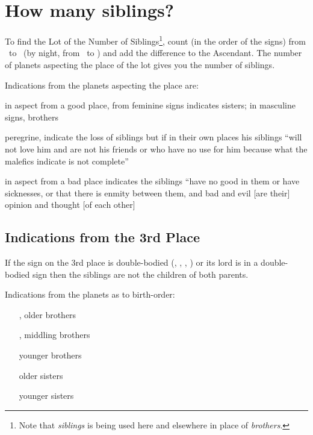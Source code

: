 \section{How many siblings?}
To find the Lot of the Number of Siblings\footnote{Note that \textsl{siblings} is being used here and elsewhere in place of \textsl{brothers}.}, count (in the order of the signs) from \Mercury\, to \Jupiter\, (by night, from \Jupiter\, to \Mercury) and add the difference to the Ascendant. The number of planets aspecting the place of the lot gives you the number of siblings.

Indications from the planets aspecting the place are:
\begin{description}[labelindent=0em , labelwidth=6em, labelsep=0.5em, leftmargin =!]
\item [\Venus,\Mercury] in aspect from a good place, from feminine signs indicates sisters; in masculine signs, brothers

\item[\Saturn,\Mars,\Sun\,\Moon] peregrine, indicate the loss of siblings but if in their own places his siblings ``will not love him and are not his friends or who have no use for him because what the malefics indicate is not complete''

\item[any planet] in aspect from a bad place indicates the siblings ``have no good in them or have sicknesses, or that there is enmity between them, and bad and evil [are their] opinion and thought [of each other]
\end{description}

\subsection{Indications from the 3rd Place}
If the sign on the 3rd place is double-bodied (\Gemini, \Virgo, \Sagittarius, \Pisces) or its lord is in a double-bodied sign then the siblings are not the children of both parents.

Indications from the planets as to birth-order:
\begin{itemize}
\item[\Saturn,\Mars] older brothers
\item[\Jupiter,\Mars] middling brothers
\item[\Mercury] younger brothers
\item[\Moon] older sisters
\item[\Venus] younger sisters
\end{itemize}

